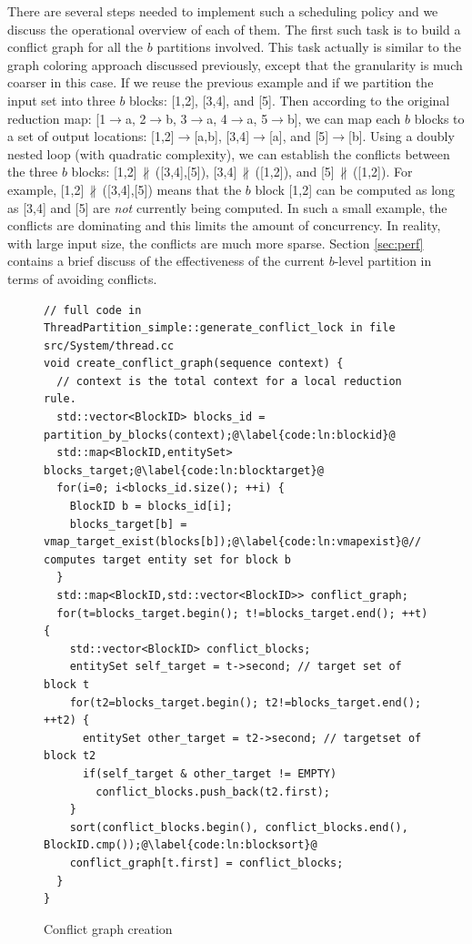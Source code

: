 \documentclass{article}
\begin{document}
There are several steps needed to implement such a scheduling policy and
we discuss the operational overview of each of them.  The first such
task is to build a conflict graph for all the $b$ partitions involved.
This task actually is similar to the graph coloring approach discussed
previously, except that the granularity is much coarser in this case.
If we reuse the previous example and if we partition the input set into
three $b$ blocks: [1,2], [3,4], and [5].  Then according to the original
reduction map: [1$\to$a, 2$\to$b, 3$\to$a, 4$\to$a, 5$\to$b], we can map
each $b$ blocks to a set of output locations: [1,2]$\to$[a,b],
[3,4]$\to$[a], and [5]$\to$[b].  Using a doubly nested loop (with
quadratic complexity), we can establish the conflicts between the three
$b$ blocks: [1,2]$\,\nparallel\,$([3,4],[5]),
[3,4]$\,\nparallel\,$([1,2]), and [5]$\,\nparallel\,$([1,2]).  For
example, [1,2]$\,\nparallel\,$([3,4],[5]) means that the $b$ block [1,2]
can be computed as long as [3,4] and [5] are \emph{not} currently being
computed.  In such a small example, the conflicts are dominating and
this limits the amount of concurrency.  In reality, with large input
size, the conflicts are much more sparse.  Section \ref{sec:perf}
contains a brief discuss of the effectiveness of the current $b$-level
partition in terms of avoiding conflicts.  

\begin{figure}[h]
\begin{lstlisting}[escapechar=@]
// full code in ThreadPartition_simple::generate_conflict_lock in file src/System/thread.cc
void create_conflict_graph(sequence context) {
  // context is the total context for a local reduction rule.
  std::vector<BlockID> blocks_id = partition_by_blocks(context);@\label{code:ln:blockid}@
  std::map<BlockID,entitySet> blocks_target;@\label{code:ln:blocktarget}@
  for(i=0; i<blocks_id.size(); ++i) {
    BlockID b = blocks_id[i];
    blocks_target[b] = vmap_target_exist(blocks[b]);@\label{code:ln:vmapexist}@// computes target entity set for block b
  }
  std::map<BlockID,std::vector<BlockID>> conflict_graph;
  for(t=blocks_target.begin(); t!=blocks_target.end(); ++t) {
    std::vector<BlockID> conflict_blocks;
    entitySet self_target = t->second; // target set of block t
    for(t2=blocks_target.begin(); t2!=blocks_target.end(); ++t2) {
      entitySet other_target = t2->second; // targetset of block t2
      if(self_target & other_target != EMPTY)
        conflict_blocks.push_back(t2.first);
    }
    sort(conflict_blocks.begin(), conflict_blocks.end(), BlockID.cmp());@\label{code:ln:blocksort}@
    conflict_graph[t.first] = conflict_blocks;
  }
}
\end{lstlisting}
\caption{Conflict graph creation\label{fig:cgc}}
\end{figure}
\end{document}
